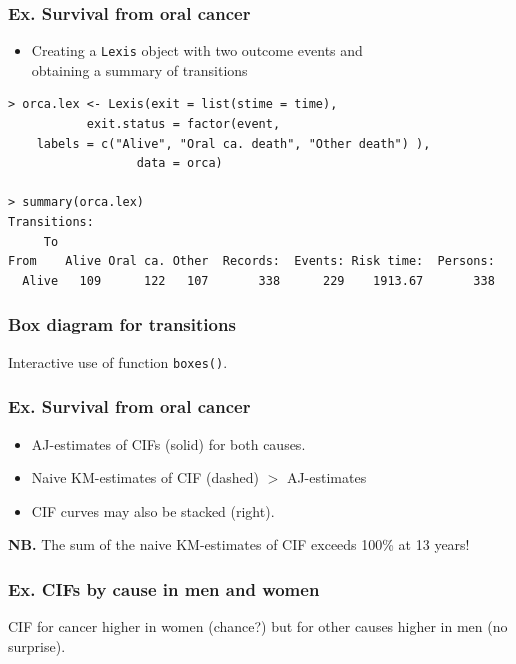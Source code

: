 \documentclass[handout,12pt,dvipsnames,t]{beamer}
\begin{document}
\begin{frame}[fragile]
\frametitle{Ex. Survival from oral cancer}

\begin{itemize}
\item
Creating a {\tt Lexis} object with two outcome events and \\ 
obtaining a summary of transitions
\end{itemize}
\small
\begin{verbatim}
> orca.lex <- Lexis(exit = list(stime = time), 
           exit.status = factor(event, 
    labels = c("Alive", "Oral ca. death", "Other death") ),
                  data = orca)

> summary(orca.lex)  
Transitions:
     To
From    Alive Oral ca. Other  Records:  Events: Risk time:  Persons:
  Alive   109      122   107       338      229    1913.67       338
\end{verbatim}
\normalsize

\end{frame}

\begin{frame}[fragile]
\frametitle{Box diagram for transitions}

Interactive use of function {\tt boxes()}.
\small
\normalsize

\end{frame}

\begin{frame}[fragile]
\frametitle{Ex. Survival from oral cancer}
\begin{itemize}
\item
AJ-estimates of CIFs (solid) for both causes.
\item
Naive KM-estimates of CIF (dashed) $>$ AJ-estimates 
\item
CIF curves may also be stacked (right).  
\end{itemize}

\textbf{NB.} The sum of the naive KM-estimates of CIF exceeds 100\% at 13 years! 
\end{frame}

\begin{frame}[fragile]
\frametitle{Ex. CIFs by cause in men and women}


CIF for cancer higher in women (chance?) but for other causes
higher in men (no surprise).

\end{frame}
\end{document}
